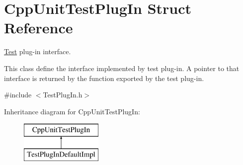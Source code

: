 \hypertarget{struct_cpp_unit_test_plug_in}{}\section{Cpp\+Unit\+Test\+Plug\+In Struct Reference}
\label{struct_cpp_unit_test_plug_in}


\hyperlink{class_test}{Test} plug-\/in interface.

This class define the interface implemented by test plug-\/in. A pointer to that interface is returned by the function exported by the test plug-\/in.  




{\ttfamily \#include $<$Test\+Plug\+In.\+h$>$}

Inheritance diagram for Cpp\+Unit\+Test\+Plug\+In\+:\begin{figure}[H]
\begin{center}
\leavevmode
\includegraphics[height=2.000000cm]{struct_cpp_unit_test_plug_in}
\end{center}
\end{figure}
